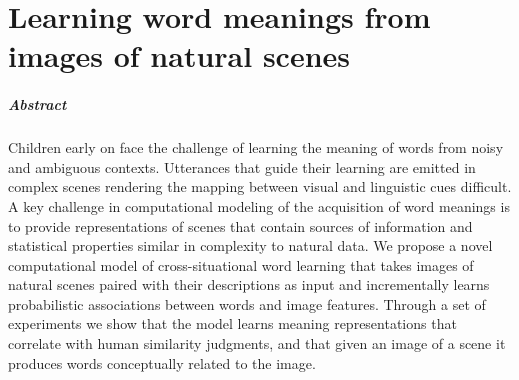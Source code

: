 





\chapter{Learning word meanings from images of natural scenes}
\label{ch:TAL}



\paragraph{Abstract}Children early on face
the challenge of learning the meaning of words
from noisy and ambiguous contexts.
Utterances that guide their learning are
emitted in complex scenes rendering the mapping between
visual and linguistic cues difficult. A key challenge in computational
modeling of the acquisition of word meanings is
to provide representations of scenes that
contain sources of information and statistical properties
similar in complexity to natural data. We propose a novel
computational model of cross-situational word learning
that takes images of natural scenes paired with
their descriptions as input and incrementally learns
probabilistic associations between words and image features.
Through a set of experiments we show
that the model learns meaning representations that correlate with human similarity
judgments, and that given
an image of a scene it produces words conceptually related to the image.

\newpage

